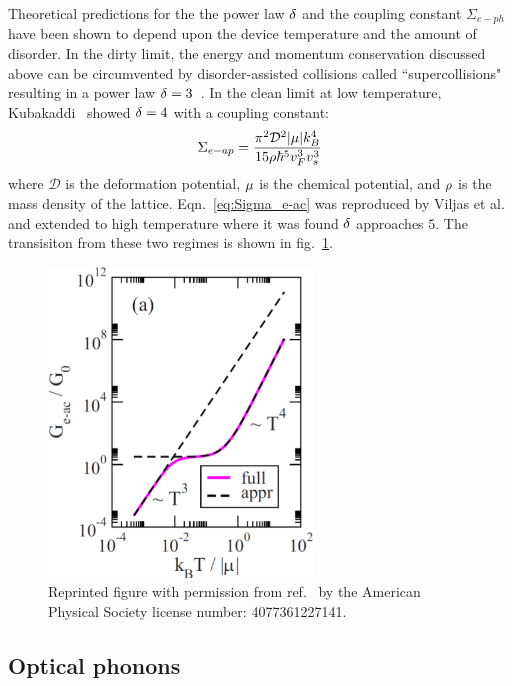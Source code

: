 Theoretical predictions for the the power law $\mathrm{\delta}$ and the coupling constant $\Sigma_{e-ph}$ have been shown to depend upon the device temperature and the amount of disorder. In the dirty limit, the energy and momentum conservation discussed above can be circumvented by disorder-assisted collisions called ``supercollisions" resulting in a  power law $\mathrm{\delta}=3$~\cite{song_disorder-assisted_2012}. In the clean limit at low temperature, Kubakaddi~\cite{kubakaddi_interaction_2009} showed $\mathrm{\delta} = 4$ with a coupling constant:
\begin{equation}\label{eq:Sigma_e-ac}
\Sigma_{e-ap}=\frac{\pi^2\mathcal{D}^2\lvert\mathrm{\mu}\rvert k_B^4}{15\mathrm{\rho}\hbar^5v_F^3v_s^3}
\end{equation}
where $\mathcal{D}$ is the deformation potential, $\mathrm{\mu}$ is the chemical potential, and $\mathrm{\rho}$ is the mass density of the lattice.
Eqn.~\ref{eq:Sigma_e-ac} was reproduced by
Viljas et al.~\cite{viljas_electron-phonon_2010} and extended to high temperature where it was found $\mathrm{\delta}$ approaches $5$. The transisiton from these two regimes is shown in fig.~\ref{fig:viljas2010}.
\begin{figure}
\centering
\includegraphics[width = 70mm]{figures/electronic_cooling/Viljas2010_conduction.png}
\caption{
Reprinted figure with permission from
ref.~\cite{viljas_electron-phonon_2010} by the American Physical Society license number: 4077361227141.}
\label{fig:viljas2010}
\end{figure}


\subsection{Optical phonons}

